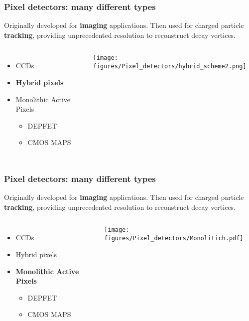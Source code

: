     \begin{frame}[noframenumbering]
        \frametitle{Pixel detectors: many different types}
        Originally developed for \textbf{imaging} applications. Then used for charged particle \textbf{tracking}, providing unprecedented resolution to reconstruct decay vertices.\\\bigskip
        \begin{columns}
                \begin{itemize}
                    \item CCDs 
                    \item \textbf{Hybrid pixels}
                    \item Monolithic Active Pixels
                    \begin{itemize}
                        \item DEPFET %
                        \item CMOS MAPS
                    \end{itemize}
                \end{itemize}
            \medskip
                \centering\texttt{[image: figures/Pixel\_detectors/hybrid\_scheme2.png]} 
        \end{columns}
    \end{frame}

    \begin{frame}[noframenumbering]
        \frametitle{Pixel detectors: many different types}
        Originally developed for \textbf{imaging} applications. Then used for charged particle \textbf{tracking}, providing unprecedented resolution to reconstruct decay vertices.\\\bigskip
        \begin{columns}
                \begin{itemize}
                    \item CCDs 
                    \item Hybrid pixels 
                    \item \textbf{Monolithic Active Pixels}
                    \begin{itemize}
                        \item DEPFET %
                        \item CMOS MAPS
                    \end{itemize}
                \end{itemize}
            \medskip
                \centering\texttt{[image: figures/Pixel\_detectors/Monolitich.pdf]} 
        \end{columns}
    \end{frame}

